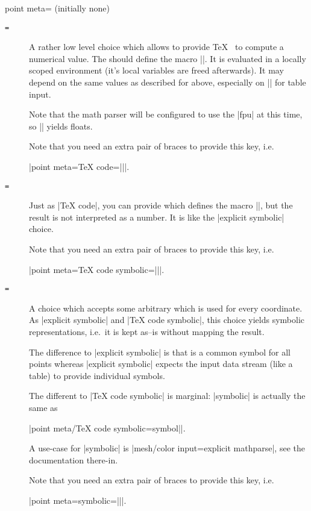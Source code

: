 \begin{pgfplotskey}{point meta= (initially none)}
\begin{description}
		\item[\normalfont{}\texttt{=}] A rather low level choice which allows to provide \TeX\  to compute a numerical value. The  should define the macro |\pgfplotspointmeta|. It is evaluated in a locally scoped environment (it's local variables are freed afterwards). It may depend on the same values as described for  above, especially on |\thisrow| for table input.

		Note that the math parser will be configured to use the |fpu| at this time, so |\pgfmathparse| yields floats. 

		Note that you need an extra pair of braces to provide this key, i.e.
		
		|point meta={TeX code=||}|.

		\item[\normalfont{}\texttt{=}] Just as |TeX code|, you can provide  which defines the macro |\pgfplotspointmeta|, but the result is not interpreted as a number. It is like the |explicit symbolic| choice.

		Note that you need an extra pair of braces to provide this key, i.e.
		
		|point meta={TeX code symbolic=||}|.
		
		\item[\normalfont{}\texttt{=}] A choice which accepts some arbitrary  which is used for every coordinate. As |explicit symbolic| and |TeX code symbolic|, this choice yields symbolic representations, i.e.\ it is kept as--is without mapping the result.

		The difference to |explicit symbolic| is that  is a common symbol for all points whereas |explicit symbolic| expects the input data stream (like a table) to provide individual symbols.

		The different to |TeX code symbolic| is marginal: |symbolic| is actually the same as 

		|point meta/TeX code symbolic={\def\pgfplotspointmeta|\marg{symbol}|}|.

		A use-case for |symbolic| is |mesh/color input=explicit mathparse|, see the documentation there-in.

		Note that you need an extra pair of braces to provide this key, i.e.
		
		|point meta={symbolic=||}|.
	\end{description}


\end{pgfplotskey}
